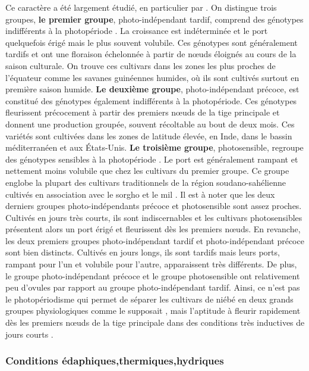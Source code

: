 \documentclass[a4paper,11pt]{article}
\begin{document}
Ce caractère a été largement étudié, en particulier par
\citeauthor{Steele_1972} \citeyear{Steele_1972}. On distingue trois
groupes, \textbf{le premier groupe}, photo-indépendant tardif,
comprend des génotypes indifférents à la photopériode
\cite{IITA_2008}. La croissance est indéterminée et le port
quelquefois érigé mais le plus souvent volubile. Ces génotypes sont
généralement tardifs et ont une floraison échelonnée à partir de nœuds
éloignés au cours de la saison culturale. On trouve ces cultivars dans
les zones les plus proches de l'équateur comme les savanes guinéennes
humides, où ils sont cultivés surtout en première saison
humide. \textbf{Le deuxième groupe}, photo-indépendant précoce, est
constitué des génotypes également indifférents à la photopériode. Ces
génotypes fleurissent précocement à partir des premiers nœuds de la
tige principale et donnent une production groupée, souvent récoltable
au bout de deux mois. Ces variétés sont cultivées dans les zones de
latitude élevée, en Inde, dans le bassin méditerranéen et aux
États-Unis. \textbf{Le troisième groupe}, photosensible, regroupe des
génotypes sensibles à la photopériode \cite{Steele_1972}. Le port est
généralement rampant et nettement moins volubile que chez les
cultivars du premier groupe. Ce groupe englobe la plupart des
cultivars traditionnels de la région soudano-sahélienne cultivés en
association avec le sorgho et le mil \cite{Doggett_1988}. Il est à
noter que les deux derniers groupes photo-indépendants précoce et
photosensible sont assez proches. Cultivés en jours très courts, ils
sont indiscernables et les cultivars photosensibles présentent alors
un port érigé et fleurissent dès les premiers nœuds. En revanche, les
deux premiers groupes photo-indépendant tardif et photo-indépendant
précoce sont bien distincts. Cultivés en jours longs, ils sont tardifs
mais leurs ports, rampant pour l'un et volubile pour l'autre,
apparaissent très différents. De plus, le groupe photo-indépendant
précoce et le groupe photosensible ont relativement peu d'ovules par
rapport au groupe photo-indépendant tardif. Ainsi, ce n'est pas le
photopériodisme qui permet de séparer les cultivars de niébé en deux
grands groupes physiologiques comme le supposait
\citeauthor{Steele_1972} \citeyear{Steele_1972}, mais l'aptitude à
fleurir rapidement dès les premiers nœuds de la tige principale dans
des conditions très inductives de jours courts \cite{IITA_2008}.

\subsubsection{Conditions édaphiques,thermiques,hydriques}
\end{document}
